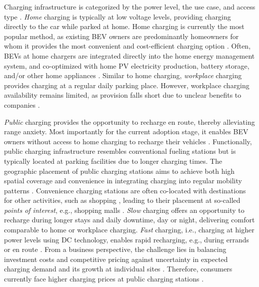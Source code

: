             Charging infrastructure is categorized by the power level, the use case, and access type \cite{LAMONACA2022111733}. \textit{Home} charging is typically at low voltage levels, providing charging directly to the car while parked at home. Home charging is currently the most popular method, as existing \ac{BEV} owners are predominantly homeowners for whom it provides the most convenient and cost-efficient charging option \cite{Baresch2019}. Often, \acp{BEV} at home chargers are integrated directly into the home energy management system, and co-optimized with home PV electricity production, battery storage, and/or other home appliances \citep{KARIMIANFARD2025115259, VANDERKAM2025137774}. Similar to home charging, \textit{workplace} charging provides charging at a regular daily parking place. However, workplace charging availability remains limited, as provision falls short due to unclear benefits to companies \citep{FETENE201693, KATAOKA2026105136}.
            
            
            \textit{Public} charging provides the opportunity to recharge en route, thereby alleviating range anxiety. Most importantly for the current adoption stage, it enables \ac{BEV} owners without access to home charging to recharge their vehicles \citep{LAMONACA2022111733, Kester2018719}.
            Functionally, public charging infrastructure resembles conventional fueling stations but is typically located at parking facilities due to longer charging times. The geographic placement of public charging stations aims to achieve both high spatial coverage and convenience in integrating charging into regular mobility patterns \cite{GHANBARIMOTLAGH2026119325}. Convenience charging stations are often co-located with destinations for other activities, such as shopping \cite{BIAN2022831}, leading to their placement at so-called \textit{points of interest}, e.g., shopping malls \cite{YU2025124894}. \textit{Slow} charging offers an opportunity to recharge during longer stays and daily downtime, day or night, delivering comfort comparable to home or workplace charging. \textit{Fast} charging, i.e., charging at higher power levels using DC technology, enables rapid recharging, e.g., during errands or en route \cite{Philipsen2020}. From a business perspective, the challenge lies in balancing investment costs and competitive pricing against uncertainty in expected charging demand and its growth at individual sites \cite{Serradilla2017}. Therefore, consumers currently face higher charging prices at public charging stations \citep{Lanz2022, KARIMIANFARD2025115259}.

